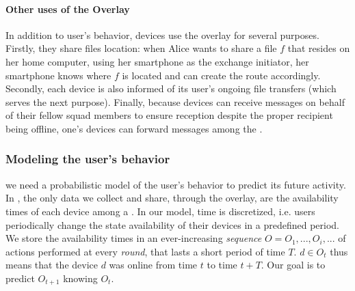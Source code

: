 \paragraph*{Other uses of the \squad Overlay} In addition to user's behavior, devices use the \squad overlay for several purposes. Firstly, they share files location: when Alice wants to share a file $f$ that resides on her home computer, using her smartphone as the exchange initiator, her smartphone knows where $f$ is located and can create the route accordingly. 
Secondly, each device is also informed of its user's ongoing file transfers (which serves the next purpose).
Finally, because devices can receive messages on behalf of their fellow squad members to ensure reception despite the proper recipient being offline, 
one's devices can forward messages among the \squad.


\subsubsection{Modeling the user's behavior}
\label{sub:a_model_of_the_user_s_behavior}

we need a probabilistic model of the user's behavior to predict its future activity.
In \name, the only data we collect and share, through the \squad overlay, are the availability times of each device among a \squad.
In our model, time is discretized, i.e. users periodically change the state availability of their devices in a predefined period.
We store the availability times in an ever-increasing \emph{sequence} $O=O_1, ..., O_i, ...$ of actions performed at every \emph{round}, that lasts a short period of time $T$. 
$d \in O_t$ thus means that the device $d$ was online from time $t$ to time $t+T$.
Our goal is to predict $O_{t+1}$ knowing $O_t$.

